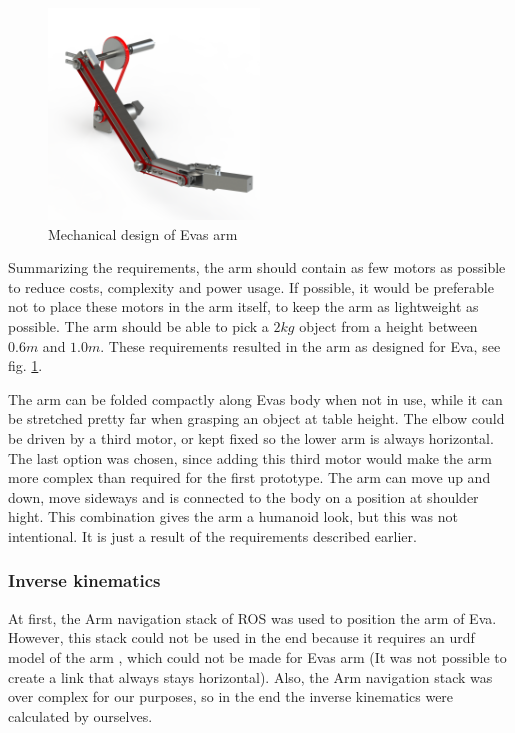 \documentclass[project_eva.tex]{subfiles}
\begin{document}
\begin{figure}[h]
	\centering
	\mbox{\includegraphics[width=0.5\textwidth]{Images/armMechOverview.png}}
	\caption{Mechanical design of Eva\textquotesingle s arm}
	\label{fig:armMechOverview}
\end{figure}

Summarizing the requirements, the arm should contain as few motors as possible to reduce costs, complexity and power 
usage. If possible, it would be preferable not to place these motors in the arm itself, to keep the arm as lightweight as 
possible. The arm should be able to pick a $2kg$ object from a height between $0.6m$ and $1.0m$. These requirements 
resulted in the arm as designed for Eva, see fig. \ref{fig:armMechOverview}.

The arm can be folded compactly along Eva\textquotesingle s body when not in use, while it can be stretched pretty far 
when grasping an object at table height. The elbow could be driven by a third motor, or kept fixed so the lower arm is 
always horizontal. The last option was chosen, since adding this third motor would make the arm more complex than 
required for the first prototype. The arm can move up and down, move sideways and is connected to the body on a position 
at shoulder hight. This combination gives the arm a humanoid look, but this was not intentional. It is just a result of 
the requirements described earlier.

\subsubsection*{Inverse kinematics}
At first, the Arm navigation stack of ROS was used to position the arm of Eva. However, this stack could not be used in 
the end because it requires an urdf model of the arm \cite{urdf}, which could not be made for Eva\textquotesingle s arm 
(It was not possible to create a link that always stays horizontal). Also, the Arm navigation stack was over complex for 
our purposes, so in the end the inverse kinematics were calculated by ourselves.  
\end{document}
